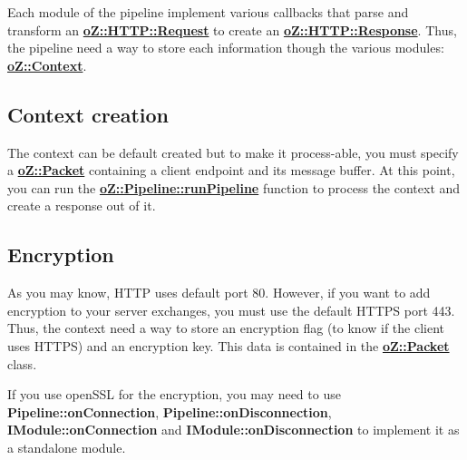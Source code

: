 Each module of the pipeline implement various callbacks that parse and transform an {\bfseries{\mbox{\hyperlink{classo_z_1_1_h_t_t_p_1_1_request}{o\+Z\+::\+H\+T\+T\+P\+::\+Request}}}} to create an {\bfseries{\mbox{\hyperlink{classo_z_1_1_h_t_t_p_1_1_response}{o\+Z\+::\+H\+T\+T\+P\+::\+Response}}}}. Thus, the pipeline need a way to store each information though the various modules\+: {\bfseries{\mbox{\hyperlink{classo_z_1_1_context}{o\+Z\+::\+Context}}}}.

\subsection*{Context creation}

The context can be default created but to make it process-\/able, you must specify a {\bfseries{\mbox{\hyperlink{classo_z_1_1_packet}{o\+Z\+::\+Packet}}}} containing a client endpoint and its message buffer. At this point, you can run the {\bfseries{\mbox{\hyperlink{classo_z_1_1_pipeline_a90bddc5511acce66f2aa780c3bba29b4}{o\+Z\+::\+Pipeline\+::run\+Pipeline}}}} function to process the context and create a response out of it. 
\begin{DoxyCode}{0}
\DoxyCodeLine{\{}
\DoxyCodeLine{}
\DoxyCodeLine{\}}
\end{DoxyCode}


\subsection*{Encryption}

As you may know, H\+T\+TP uses default port 80. However, if you want to add encryption to your server exchanges, you must use the default H\+T\+T\+PS port 443. Thus, the context need a way to store an encryption flag (to know if the client uses H\+T\+T\+PS) and an encryption key. This data is contained in the {\bfseries{\mbox{\hyperlink{classo_z_1_1_packet}{o\+Z\+::\+Packet}}}} class.

If you use open\+S\+SL for the encryption, you may need to use {\bfseries{Pipeline\+::on\+Connection}}, {\bfseries{Pipeline\+::on\+Disconnection}}, {\bfseries{I\+Module\+::on\+Connection}} and {\bfseries{I\+Module\+::on\+Disconnection}} to implement it as a standalone module.


